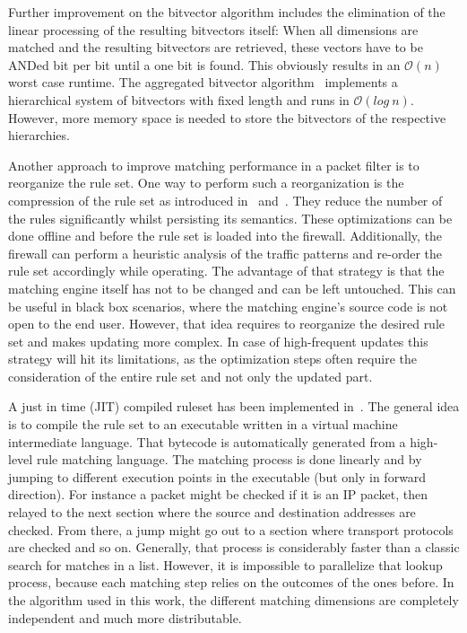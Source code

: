 \documentclass[a4paper,
		12pt,
		parskip=full,
		titlepage
		]{scrartcl}
\begin{document}
Further improvement on the bitvector algorithm includes the elimination of the linear processing of the resulting bitvectors itself:
When all dimensions are matched and the resulting bitvectors are retrieved, these vectors have to be ANDed bit per bit until a one bit is found.
This obviously results in an $\mathcal O(n)$ worst case runtime.
The aggregated bitvector algorithm~\cite{abv} implements a hierarchical system 
of bitvectors with fixed length and runs in $\mathcal O(log\ n)$.
However, more memory space is needed to store the bitvectors of the respective hierarchies.

Another approach to improve matching performance in a packet filter is to reorganize the rule set.
One way to perform such a reorganization is the compression of the rule set as introduced in~\cite{firewall_compressor} and~\cite{redundancy_removal}.
They reduce the number of the rules significantly whilst persisting its semantics.
These optimizations can be done offline and before the rule set is loaded into the firewall.
Additionally, the firewall can perform a heuristic analysis of the traffic patterns and re-order the rule set accordingly while operating.
The advantage of that strategy is that the matching engine itself has not to be changed and can be left untouched.
This can be useful in black box scenarios, where the matching engine's source code is not open to the end user.
However, that idea requires to reorganize the desired rule set and makes updating more complex.
In case of high-frequent updates this strategy will hit its limitations, 
as the optimization steps often require the consideration of the entire rule set and not only the updated part.

A just in time (JIT) compiled ruleset has been implemented in~\cite{bpfplus}.
The general idea is to compile the rule set to an executable written in a virtual machine intermediate language.
That bytecode is automatically generated from a high-level rule matching language.
The matching process is done linearly and by jumping to different execution points in the executable (but only in forward direction).
For instance a packet might be checked if it is an IP packet, then relayed to the next section where the source and destination addresses are checked.
From there, a jump might go out to a section where transport protocols are checked and so on.
Generally, that process is considerably faster than a classic search for matches in a list.
However, it is impossible to parallelize that lookup process, because each matching step relies on the outcomes of the ones before.
In the algorithm used in this work, the different matching dimensions are 
completely independent and much more distributable.
\end{document}
